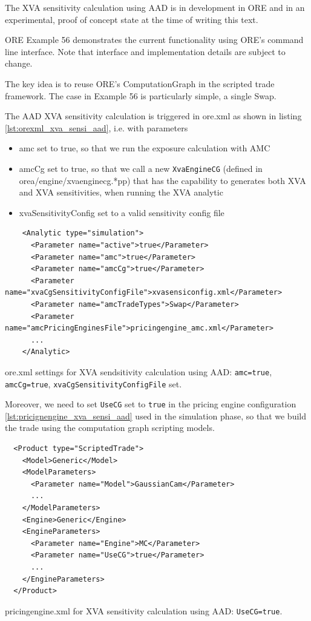 \documentclass[12pt, a4paper]{report}
\begin{document}
The XVA sensitivity calculation using AAD is in development in ORE and in an experimental,
proof of concept state at the time of writing this text.

ORE Example 56 demonstrates the current functionality using ORE's command line interface.
Note that interface and implementation details are subject to change.

The key idea is to reuse ORE's ComputationGraph in the scripted trade framework.
The case in Example 56 is particularly simple, a single Swap.

The AAD XVA sensitivity calculation is triggered in ore.xml as shown in listing
\ref{lst:orexml_xva_sensi_aad}, i.e. with parameters
\begin{itemize}
\item amc set to true, so that we run the exposure calculation with AMC
\item amcCg set to true, so that we call a new {\tt XvaEngineCG} (defined in
  orea/engine/xvaenginecg.*pp) that has the capability to generates both XVA and XVA sensitivities,
  when running the XVA analytic
\item xvaSensitivityConfig set to a valid sensitivity config file
\end{itemize}

\begin{listing}[hbt]
\begin{verbatim}
    <Analytic type="simulation">
      <Parameter name="active">true</Parameter>
      <Parameter name="amc">true</Parameter>
      <Parameter name="amcCg">true</Parameter>
      <Parameter name="xvaCgSensitivityConfigFile">xvasensiconfig.xml</Parameter>
      <Parameter name="amcTradeTypes">Swap</Parameter>
      <Parameter name="amcPricingEnginesFile">pricingengine_amc.xml</Parameter>
      ...
    </Analytic>
\end{verbatim}
\caption{ore.xml settings for XVA sendsitivity calculation using AAD: {\tt amc=true},
  {\tt amcCg=true}, {\tt xvaCgSensitivityConfigFile} set.}
\label{lst:orexml_xva_sensi_aad}
\end{listing}

Moreover, we need to set {\tt UseCG} set to {\tt true} in the pricing engine configuration
\ref{lst:pricignengine_xva_sensi_aad} used in the simulation phase,
so that we build the trade using the computation graph scripting models.

\begin{listing}[hbt]
\begin{verbatim}
  <Product type="ScriptedTrade">
    <Model>Generic</Model>
    <ModelParameters>
      <Parameter name="Model">GaussianCam</Parameter>
      ...
    </ModelParameters>
    <Engine>Generic</Engine>
    <EngineParameters>
      <Parameter name="Engine">MC</Parameter>
      <Parameter name="UseCG">true</Parameter>
      ...
    </EngineParameters>
  </Product>
\end{verbatim}
\caption{pricingengine.xml for XVA sensitivity calculation using AAD: {\tt UseCG=true}.}
\label{lst:pricignengine_xva_sensi_aad}
\end{listing}
\end{document}
